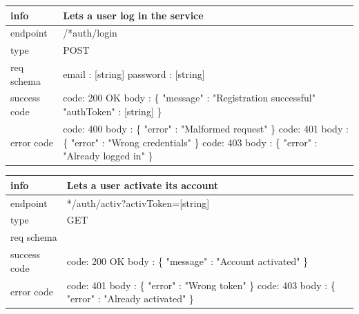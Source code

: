 \documentclass[titlepage]{article}
\begin{document}
\vspace{\baselineskip}

\begin{tabularx}{\textwidth}{lX} \hline
    info & Lets a user log in the service \\ \hline
    endpoint & /*auth/login \\ \hline
    type & POST \\ \hline
    req schema & 
        email : [string] \newline
        password : [string] \\ \hline
    success code &
        code: 200 OK \newline \newline 
        body : \{ \newline
        "message" : "Registration successful" \newline
        "authToken" : [string] \newline
        \} \\ \hline
    error code &
        code: 400 \newline
        body : \{ "error" : "Malformed request" \} \newline \newline
        code: 401 \newline
        body : \{ "error" : "Wrong credentials" \} \newline \newline
        code: 403 \newline
        body : \{ "error" : "Already logged in" \} 
\end{tabularx}
		
\vspace{\baselineskip}

\begin{tabularx}{\textwidth}{lX} \hline
    info & Lets a user activate its account \\ \hline
    endpoint & */auth/activ?activToken=[string] \\ \hline
    type & GET \\ \hline
    req schema & \\ \hline
    success code &
        code: 200 OK \newline \newline 
        body : \{ \newline
        "message" : "Account activated" \newline
        \} \\ \hline
    error code &
        code: 401 \newline
        body : \{ "error" : "Wrong token" \} \newline \newline
        code: 403 \newline
        body : \{ "error" : "Already activated" \}
\end{tabularx}
		
\end{document}
